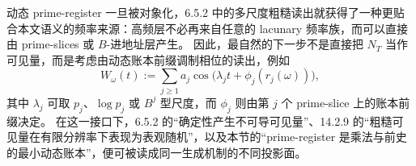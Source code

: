 \begin{remark}\label{rem:emergent-arithmetic-dynamic-prime-register-rough-readout-interface}
动态 prime-register 一旦被对象化，6.5.2 中的多尺度粗糙读出就获得了一种更贴合本文语义的频率来源：高频层不必再来自任意的 lacunary 频率族，而可以直接由 prime-slices 或 \(B\)-进地址层产生。
因此，最自然的下一步不是直接把 \(N_T\) 当作可见量，而是考虑由动态账本前缀调制相位的读出，例如
\[
W_\omega(t)
:=
\sum_{j\ge 1}
a_j
\cos\!\bigl(\lambda_j t+\phi_j(r_j(\omega))\bigr),
\]
其中 \(\lambda_j\) 可取 \(p_j\)、\(\log p_j\) 或 \(B^j\) 型尺度，而 \(\phi_j\) 则由第 \(j\) 个 prime-slice 上的账本前缀决定。
在这一接口下，6.5.2 的“确定性产生不可导可见量”、14.2.9 的“粗糙可见量在有限分辨率下表现为表观随机”，以及本节的“prime-register 是乘法与前史的最小动态账本”，便可被读成同一生成机制的不同投影面。
\end{remark}
